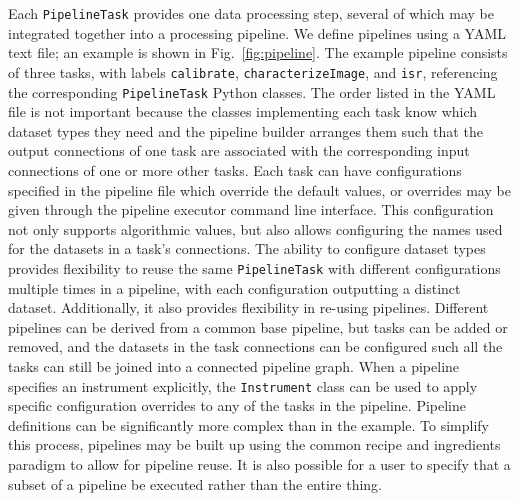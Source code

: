 \documentclass[]{spie}
\begin{document}
Each \texttt{PipelineTask} provides one data processing step, several of which may be integrated together into a processing pipeline.
We define pipelines using a YAML text file; an example is shown in Fig.~\ref{fig:pipeline}.
The example pipeline consists of three tasks, with labels \texttt{calibrate}, \texttt{characterizeImage}, and \texttt{isr}, referencing the corresponding \texttt{PipelineTask} Python classes.
The order listed in the YAML file is not important because the classes implementing each task know which dataset types they need and the pipeline builder arranges them such that the output connections of one task are associated with the corresponding input connections of one or more other tasks.
Each task can have configurations specified in the pipeline file which override the default values, or overrides may be given through the pipeline executor command line interface.
This configuration not only supports algorithmic values, but also allows configuring the names used for the datasets in a task's connections.
The ability to configure dataset types provides flexibility to reuse the same \texttt{PipelineTask} with different configurations multiple times in a pipeline, with each configuration outputting a distinct dataset.
Additionally, it also provides flexibility in re-using pipelines.
Different pipelines can be derived from a common base pipeline, but tasks can be added or removed, and the datasets in the task connections can be configured such all the tasks can still be joined into a connected pipeline graph.
When a pipeline specifies an instrument explicitly, the \texttt{Instrument} class can be used to apply specific configuration overrides to any of the tasks in the pipeline.
Pipeline definitions can be significantly more complex than in the example.
To simplify this process, pipelines may be built up using the common recipe and ingredients paradigm\cite{2015A&C.....9...40J,2020ASPC..522..583L} to allow for pipeline reuse.
It is also possible for a user to specify that a subset of a pipeline be executed rather than the entire thing.
\end{document}
